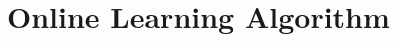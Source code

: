 \documentclass[main.tex]{subfiles}
\begin{document}
\chapter{Online Learning Algorithm}
\end{document}
